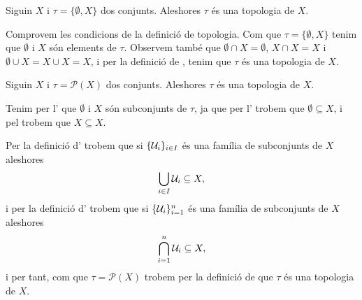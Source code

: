 \documentclass[../../Main.tex]{subfiles}
\begin{document}
	\begin{example}
		\label{ex:topologia grollera}
		Siguin \(X\) i \(\tau=\{\emptyset,X\}\) dos conjunts. Aleshores \(\tau\) és una topologia de \(X\).
		\begin{solution}
			Comprovem les condicions de la definició de topologia. Com que \(\tau=\{\emptyset,X\}\) tenim que \(\emptyset\) i \(X\) són elements de \(\tau\). Observem també que \(\emptyset\cap X=\emptyset\), \(X\cap X=X\) i \(\emptyset\cup X=X\cup X=X\), i per la definició de , tenim que \(\tau\) és una topologia de \(X\).
		\end{solution}
	\end{example}
	\begin{example}
		\label{ex:topologia discreta}
		Siguin \(X\) i \(\tau=\mathcal{P}(X)\) dos conjunts. Aleshores \(\tau\) és una topologia de \(X\).
		\begin{solution}
			Tenim per l' que \(\emptyset\) i \(X\) són subconjunts de \(\tau\), ja que per l' trobem que \(\emptyset\subseteq X\), i pel  trobem que \(X\subseteq X\).
			
			Per la definició d' trobem que si \(\{\mathcal{U}_{i}\}_{i\in I}\) és una família de subconjunts de \(X\) aleshores
			\[
			    \bigcup_{i\in I}\mathcal{U}_{i}\subseteq X,
			\]
			i per la definició d' trobem que si \(\{\mathcal{U}_{i}\}_{i=1}^{n}\) és una família de subconjunts de \(X\) aleshores
			\[
			    \bigcap_{i=1}^{n}\mathcal{U}_{i}\subseteq X,
			\]
			i per tant, com que \(\tau=\mathcal{P}(X)\) trobem per la definició de  que \(\tau\) és una topologia de \(X\).
		\end{solution}
	\end{example}
\end{document}
